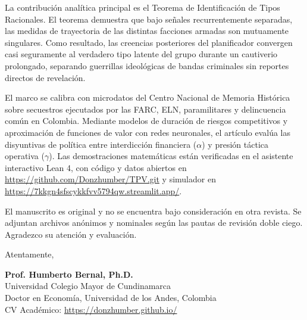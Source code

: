 \documentclass[11pt]{article}
\begin{document}
\vspace{0.5em}

\noindent La contribución analítica principal es el Teorema de Identificación de Tipos Racionales. El teorema demuestra que bajo señales recurrentemente separadas, las medidas de trayectoria de las distintas facciones armadas son mutuamente singulares. Como resultado, las creencias posteriores del planificador convergen casi seguramente al verdadero tipo latente del grupo durante un cautiverio prolongado, separando guerrillas ideológicas de bandas criminales sin reportes directos de revelación.

\vspace{0.5em}

\noindent El marco se calibra con microdatos del Centro Nacional de Memoria Histórica sobre secuestros ejecutados por las FARC, ELN, paramilitares y delincuencia común en Colombia. Mediante modelos de duración de riesgos competitivos y aproximación de funciones de valor con redes neuronales, el artículo evalúa las disyuntivas de política entre interdicción financiera ($\alpha$) y presión táctica operativa ($\gamma$). Las demostraciones matemáticas están verificadas en el asistente interactivo Lean 4, con código y datos abiertos en \url{https://github.com/Donzhumber/TPV.git} y simulador en \url{https://7kkgn4sfscykkfvv5794qw.streamlit.app/}.

\vspace{0.5em}

\noindent El manuscrito es original y no se encuentra bajo consideración en otra revista. Se adjuntan archivos anónimos y nominales según las pautas de revisión doble ciego. Agradezco su atención y evaluación.

\vspace{1.2em}

\begin{flushleft}
Atentamente,

\vspace{1.0em}

\textbf{Prof. Humberto Bernal, Ph.D.} \\
Universidad Colegio Mayor de Cundinamarca \\
Doctor en Economía, Universidad de los Andes, Colombia \\
CV Académico: \url{https://donzhumber.github.io/}
\end{flushleft}
\end{document}
